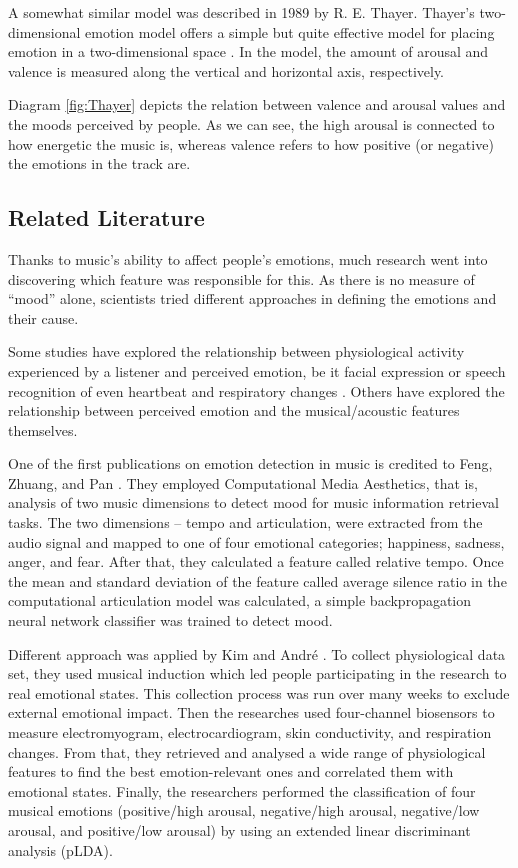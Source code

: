 A somewhat similar model was described in 1989 by R. E. Thayer. Thayer’s two-dimensional emotion model offers a simple but quite effective model for placing emotion in a two-dimensional space \cite{Thayer}. In the model, the amount of arousal and valence is measured along the vertical and horizontal axis, respectively.

Diagram \ref{fig:Thayer} depicts the relation between valence and arousal values and the moods perceived by people. As we can see, the high arousal is connected to how energetic the music is, whereas valence refers to how positive (or negative) the emotions in the track are. 

\vspace{10pt}

\subsection{Related Literature}

Thanks to music's ability to affect people's emotions, much research went into discovering which feature was responsible for this. As there is no measure of ``mood'' alone, scientists tried different approaches in defining the emotions and their cause.

Some studies have explored the relationship between physiological activity experienced by a listener and perceived emotion, be it facial expression or speech recognition of even heartbeat and respiratory changes \cite{physicalmood}.
Others have explored the relationship between perceived emotion and the musical/acoustic features themselves.

One of the first publications on emotion detection in music is credited to Feng, Zhuang, and Pan \cite{moodold}. They employed Computational Media Aesthetics, that is, analysis of two music dimensions to detect mood for music information retrieval tasks. The two dimensions -- tempo and articulation, were extracted from the audio signal and mapped to one of four emotional categories; happiness, sadness, anger, and fear. 
After that, they calculated a feature called relative tempo. Once the mean and standard deviation of the feature called average silence ratio in the computational articulation model was calculated, a simple backpropagation neural network classifier was trained to detect mood.

Different approach was applied by Kim and Andr\'{e} \cite{physicalmood}. To collect physiological data set, they used musical induction which led people participating in the research to real emotional states. This collection process was run over many weeks to exclude external emotional impact. Then the researches used four-channel biosensors to measure electromyogram, electrocardiogram, skin conductivity, and respiration changes. From that, they retrieved and analysed a wide range of physiological features to find the best emotion-relevant ones and correlated them with emotional states. Finally, the researchers performed the classification of four musical emotions (positive/high arousal, negative/high arousal, negative/low arousal, and positive/low arousal) by using an extended linear discriminant analysis (pLDA).

